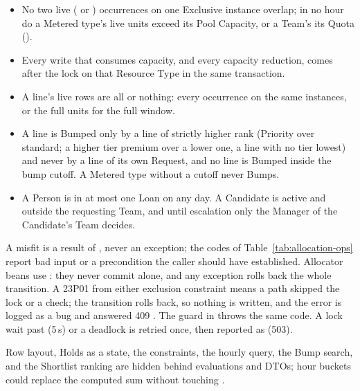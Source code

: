 \begin{itemize}
\item No two live ( or ) occurrences on one Exclusive instance overlap; in no hour do a Metered type's live units exceed its Pool Capacity, or a Team's its Quota ().
\item Every write that consumes capacity, and every capacity reduction, comes after the lock on that Resource Type in the same transaction.
\item A line's live rows are all or nothing: every occurrence on the same instances, or the full units for the full window.
\item A line is Bumped only by a line of strictly higher rank (Priority over standard; a higher tier premium over a lower one, a line with no tier lowest) and never by a line of its own Request, and no line is Bumped inside the bump cutoff. A Metered type without a cutoff never Bumps.
\item A Person is in at most one Loan on any day. A Candidate is active and outside the requesting Team, and until escalation only the Manager of the Candidate's Team decides.
\end{itemize}

A misfit is a result of , never an exception; the codes of Table~\ref{tab:allocation-ops} report bad input or a precondition the caller should have established. Allocator beans use : they never commit alone, and any exception rolls back the whole transition. A 23P01 from either exclusion constraint means a path skipped the lock or a check; the transition rolls back, so nothing is written, and the error is logged as a bug and answered 409 . The guard in  throws the same code. A lock wait past  (5\,s) or a deadlock is retried once, then reported as  (503).

Row layout, Holds as a state, the constraints, the hourly query, the Bump search, and the Shortlist ranking are hidden behind evaluations and DTOs; hour buckets could replace the computed sum without touching .

